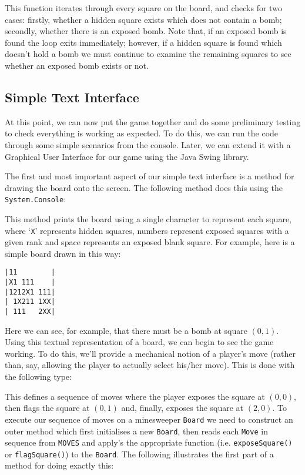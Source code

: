 This function iterates through every square on the board, and checks for two cases: firstly, whether a hidden square exists which does not contain a bomb; secondly, whether there is an exposed bomb.  Note that, if an exposed bomb is found the loop exits immediately; however, if a hidden square is found which doesn't hold a bomb we must continue to examine the remaining squares to see whether an exposed bomb exists or not.

\subsection{Simple Text Interface}
At this point, we can now put the game together and do some preliminary testing to check everything is working as expected.  To do this, we can run the code through some simple scenarios from the console.  Later, we can extend it with a Graphical User Interface for our game using the Java Swing library. 

The first and most important aspect of our simple text interface is a method for drawing the board onto the screen.  The following method does this using the \lstinline{System.Console}:



This method prints the board using a single character to represent each square, where `\verb+X+' represents hidden squares, numbers represent exposed squares with a given rank and space represents an exposed blank square.  For example, here is a simple board drawn in this way:
\begin{lstlisting}
|11        |
|X1 111    |
|1212X1 111|
| 1X211 1XX|
| 111   2XX|
\end{lstlisting}
Here we can see, for example, that there must be a bomb at square $(0,1)$.  Using this textual representation of a board, we can begin to see the game working.  To do this, we'll provide a mechanical notion of a player's move (rather than, say, allowing the player to actually select his/her move).  This is done with the following type:



This defines a sequence of moves where the player exposes the square at $(0,0)$, then flags the square at $(0,1)$ and, finally, exposes the square at $(2,0)$.  To execute our sequence of moves on a minesweeper \lstinline{Board} we need to construct an outer method which first initialises a new \lstinline{Board}, then reads each \lstinline{Move} in sequence from \lstinline{MOVES} and apply's the appropriate function (i.e. \lstinline{exposeSquare()} or \lstinline{flagSquare()}) to the \lstinline{Board}.  The following illustrates the first part of a method for doing exactly this:

